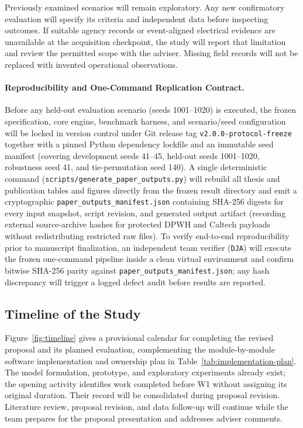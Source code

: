 Previously examined scenarios will remain exploratory. Any new
confirmatory evaluation will specify its criteria and independent data
before inspecting outcomes. If suitable agency records or event-aligned
electrical evidence are unavailable at the acquisition checkpoint, the
study will report that limitation and review the permitted scope with the
adviser. Missing field records will not be replaced with invented
operational observations.

\paragraph{Reproducibility and One-Command Replication Contract.}
Before any held-out evaluation scenario (seeds 1001--1020) is executed, the
frozen specification, core engine, benchmark harness, and scenario/seed
configuration will be locked in version control under Git release tag
\texttt{v2.0.0-protocol-freeze} together with a pinned Python dependency
lockfile and an immutable seed manifest (covering development seeds 41--45,
held-out seeds 1001--1020, robustness seed 41, and tie-permutation seed 140).
A single deterministic command
(\texttt{scripts/generate\_\allowbreak paper\_\allowbreak outputs.py}) will
rebuild all thesis and publication tables and figures directly from the
frozen result directory and emit a cryptographic
\texttt{paper\_\allowbreak outputs\_\allowbreak manifest.json} containing
SHA-256 digests for every input snapshot, script revision, and generated
output artifact (recording external source-archive hashes for protected DPWH
and Caltech payloads without redistributing restricted raw files). To verify
end-to-end reproducibility prior to manuscript finalization, an independent
team verifier (\texttt{DJA}) will execute the frozen one-command pipeline
inside a clean virtual environment and confirm bitwise SHA-256 parity against
\texttt{paper\_\allowbreak outputs\_\allowbreak manifest.json}; any hash
discrepancy will trigger a logged defect audit before results are reported.

\subsection{Timeline of the Study}\label{study-timeline}

Figure~\ref{fig:timeline} gives a provisional calendar for completing the
revised proposal and its planned evaluation, complementing the
module-by-module software implementation and ownership plan in
Table~\ref{tab:implementation-plan}. The model formulation,
prototype, and exploratory experiments already exist; the opening activity
identifies work completed before W1 without assigning its original duration.
Their record will be consolidated during proposal revision.
Literature review, proposal revision, and data follow-up will continue while
the team prepares for the proposal presentation and addresses adviser comments.

